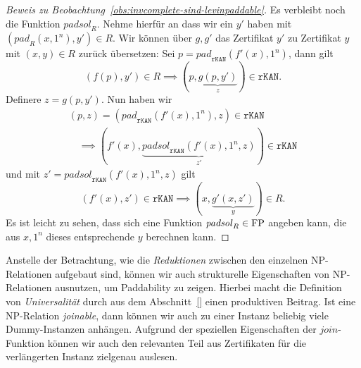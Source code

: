 \begin{proof}[Beweis zu Beobachtung~\ref{obs:invcomplete-sind-levinpaddable}]
    Es verbleibt noch die Funktion $\mathit{padsol}_R$. Nehme hierfür an dass wir ein $y'$ haben mit $(\mathit{pad}_R(x, 1^n), y')\in R$.
    Wir können über $g, g'$ das Zertifikat $y'$ zu Zertifikat $y$ mit $(x, y)\in R$ zurück übersetzen:
    Sei $p=\mathit{pad}_\mathtt{rKAN}(f'(x), 1^n)$, dann gilt
    \[ (f(p), y')\in R \implies (p, \underbrace{g(p, y')}_z)\in \mathtt{rKAN}. \]
    Definere $z=g(p, y')$.
    Nun haben wir
    \begin{gather*} (p, z)=(\mathit{pad}_\mathtt{rKAN}(f'(x), 1^n), z)\in\mathtt{rKAN}  \\\quad\implies (f'(x), \underbrace{\mathit{padsol}_\mathtt{rKAN}(f'(x), 1^n, z)}_{z'})\in\mathtt{rKAN} \end{gather*}
    und mit $z'=\mathit{padsol}_\mathtt{rKAN}(f'(x), 1^n, z)$ gilt
    \[ (f'(x), z') \in \mathtt{rKAN} \implies (x, \underbrace{g'(x, z')}_{y}) \in R. \]
    Es ist leicht zu sehen, dass sich eine Funktion $\mathit{padsol}_R\in\mathrm{FP}$ angeben kann, die aus $x, 1^n$ dieses entsprechende $y$ berechnen kann.
\end{proof}

Anstelle der Betrachtung, wie die \emph{Reduktionen} zwischen den einzelnen NP-Relationen aufgebaut sind, können wir auch strukturelle Eigenschaften von NP-Relationen ausnutzen, um Paddability zu zeigen. Hierbei macht die Definition von \emph{Universalität} durch \textcite{agrawal_universal_1992} aus dem Abschnitt~\ref{} einen produktiven Beitrag. Ist eine NP-Relation \emph{joinable}, dann können wir auch zu einer Instanz beliebig viele Dummy-Instanzen anhängen. Aufgrund der speziellen Eigenschaften der $\mathit{join}$-Funktion können wir auch den relevanten Teil aus Zertifikaten für die verlängerten Instanz zielgenau auslesen.

